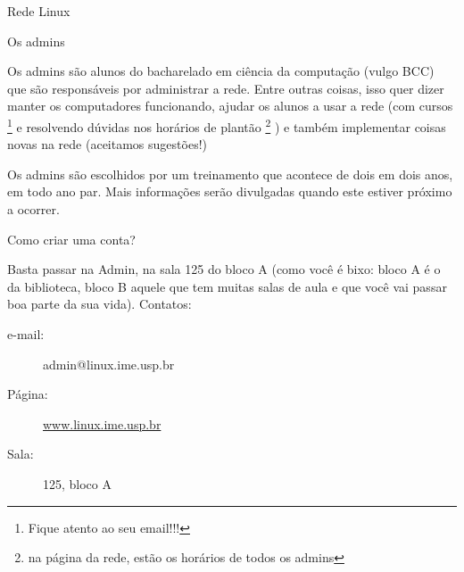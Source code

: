 \begin{secao}{Rede Linux}
\begin{subsecao}{Os admins}

Os admins são alunos do bacharelado em ciência da computação (vulgo BCC) que
são responsáveis por administrar a rede. Entre outras coisas, isso quer dizer
manter os computadores funcionando, ajudar os alunos a usar a rede (com
cursos \footnote{Fique atento ao seu email!!!} e resolvendo
dúvidas nos horários de plantão \footnote{na página da rede, estão os horários
de todos os admins}
) e também implementar coisas novas na rede (aceitamos sugestões!)

Os admins são escolhidos por um treinamento que acontece de dois em dois anos,
em todo ano par. Mais informações serão divulgadas quando este estiver próximo
a ocorrer.

\end{subsecao}
\begin{subsecao}{Como criar uma conta?}

Basta passar na Admin, na sala 125 do bloco A (como você é bixo: bloco A é o da
biblioteca, bloco B aquele que tem muitas salas de aula e que você vai passar boa 
parte da sua vida). Contatos:
\begin{description}

\item [e-mail:] admin@linux.ime.usp.br
\item [Página:] \url{www.linux.ime.usp.br}
\item [Sala:] 125, bloco A

\end{description}
\end{subsecao}
\end{secao}
